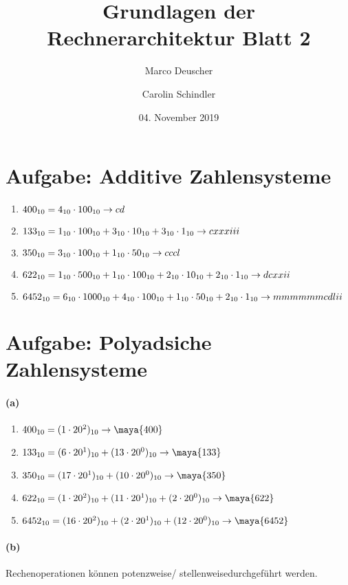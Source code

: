 \documentclass[a4paper]{article}
\title{Grundlagen der Rechnerarchitektur Blatt 2}
\author{Marco Deuscher \and Carolin Schindler}
\date{04. November 2019}
\newcommand{\uproman}[1]{\uppercase\expandafter{\romannumeral#1}}
\begin{document}
\maketitle

\section{Aufgabe: Additive Zahlensysteme}
\begin{enumerate}
	\item $400_{10} = 4_{10} \cdot 100_{10} \rightarrow \uproman{400}$
	\item $133_{10} = 1_{10} \cdot 100_{10} + 3_{10} \cdot 10_{10} + 3_{10} \cdot 1_{10} \rightarrow \uproman{133}$
	\item $350_{10} = 3_{10} \cdot 100_{10} + 1_{10} \cdot 50_{10} \rightarrow \uproman{350}$
	\item $622_{10} = 1_{10} \cdot 500_{10} + 1_{10} \cdot 100_{10} + 2_{10} \cdot 10_{10} + 2_{10} \cdot 1_{10} \rightarrow \uproman{622}$
	\item $6452_{10} = 6_{10} \cdot 1000_{10} + 4_{10} \cdot 100_{10} + 1_{10} \cdot 50_{10} + 2_{10} \cdot 1_{10} \rightarrow \uproman{6452}$
\end{enumerate}

\section{Aufgabe: Polyadsiche Zahlensysteme}
\paragraph{(a)}
	\begin{enumerate}
		\item $400_{10} = (1\cdot20^2)_{10} \rightarrow \maya{400}$
		\item $133_{10} = (6\cdot20^1)_{10} + (13\cdot20^0)_{10} \rightarrow \maya{133}$
		\item $350_{10} = (17\cdot20^1)_{10} + (10\cdot20^0)_{10} \rightarrow \maya{350}$
		\item $622_{10} = (1\cdot20^2)_{10} + (11\cdot20^1)_{10} + (2\cdot20^0)_{10} \rightarrow \maya{622}$
		\item $6452_{10} = (16\cdot20^2)_{10} + (2\cdot20^1)_{10} + (12\cdot20^0)_{10} \rightarrow \maya{6452}$
	\end{enumerate}
\paragraph{(b)}
Rechenoperationen können \glqq potenzweise\grqq / \glqq stellenweise\grqq durchgeführt werden.
\end{document}
